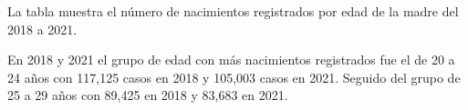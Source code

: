 La tabla muestra el número de nacimientos registrados por edad de la madre del 2018 a 2021. 

En 2018 y 2021 el grupo de edad con más nacimientos registrados fue el de 20 a 24 años con 117,125 casos en 2018 y 105,003 casos en 2021. Seguido del grupo de 25 a 29 años con 89,425 en 2018 y 83,683 en 2021.   